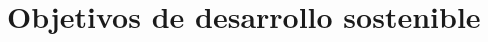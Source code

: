 \documentclass[11pt,spanish,listoffigures,listoftables]{tfgetsinf}
\begin{document}








\chapter{Objetivos de desarrollo sostenible} \label{ch:ods}
\end{document}
